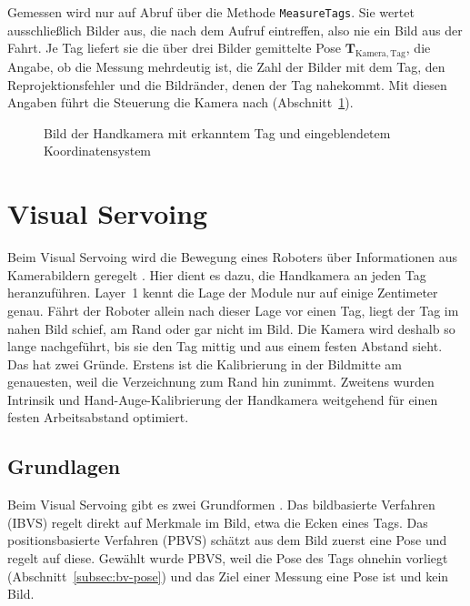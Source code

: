Gemessen wird nur auf Abruf über die Methode \texttt{MeasureTags}. Sie wertet ausschließlich Bilder aus, die nach dem Aufruf eintreffen, also nie ein Bild aus der Fahrt. Je Tag liefert sie die über drei Bilder gemittelte Pose $\mathbf{T}_{\mathrm{Kamera,Tag}}$, die Angabe, ob die Messung mehrdeutig ist, die Zahl der Bilder mit dem Tag, den Reprojektionsfehler und die Bildränder, denen der Tag nahekommt. Mit diesen Angaben führt die Steuerung die Kamera nach (Abschnitt~\ref{sec:servoing}).

\begin{figure}[htbp]
    \centering
    \caption{Bild der Handkamera mit erkanntem Tag und eingeblendetem Koordinatensystem}
    \label{fig:bv-tagbild}
\end{figure}


\section{Visual Servoing}
\label{sec:servoing}
Beim Visual Servoing wird die Bewegung eines Roboters über Informationen aus Kamerabildern geregelt \cite{Hutchinson1996}. Hier dient es dazu, die Handkamera an jeden Tag heranzuführen. Layer~1 kennt die Lage der Module nur auf einige Zentimeter genau. Fährt der Roboter allein nach dieser Lage vor einen Tag, liegt der Tag im nahen Bild schief, am Rand oder gar nicht im Bild. Die Kamera wird deshalb so lange nachgeführt, bis sie den Tag mittig und aus einem festen Abstand sieht. Das hat zwei Gründe. Erstens ist die Kalibrierung in der Bildmitte am genauesten, weil die Verzeichnung zum Rand hin zunimmt. Zweitens wurden Intrinsik und Hand-Auge-Kalibrierung der Handkamera weitgehend für einen festen Arbeitsabstand optimiert.

\subsection{Grundlagen}
\label{subsec:vs-grundlagen}
Beim Visual Servoing gibt es zwei Grundformen \cite{Chaumette2006}. Das bildbasierte Verfahren (IBVS) regelt direkt auf Merkmale im Bild, etwa die Ecken eines Tags. Das positionsbasierte Verfahren (PBVS) schätzt aus dem Bild zuerst eine Pose und regelt auf diese. Gewählt wurde PBVS, weil die Pose des Tags ohnehin vorliegt (Abschnitt~\ref{subsec:bv-pose}) und das Ziel einer Messung eine Pose ist und kein Bild.

